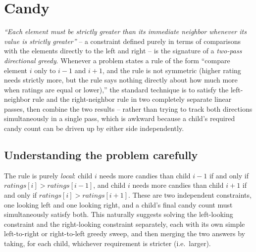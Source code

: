 \section{Candy}
\label{sec:candy}


\begin{patternbox}
\emph{``Each element must be strictly greater than its immediate neighbor
whenever its value is strictly greater''} -- a constraint defined purely in
terms of comparisons with the elements directly to the left and right -- is
the signature of a \emph{two-pass directional greedy}. Whenever a problem
states a rule of the form ``compare element $i$ only to $i-1$ and $i+1$, and
the rule is not symmetric (higher rating needs strictly more, but the rule
says nothing directly about how much more when ratings are equal or lower),''
the standard technique is to satisfy the left-neighbor rule and the
right-neighbor rule in two completely separate linear passes, then combine
the two results -- rather than trying to track both directions
simultaneously in a single pass, which is awkward because a child's
required candy count can be driven up by either side independently.
\end{patternbox}

\subsection*{Understanding the problem carefully}

The rule is purely \emph{local}: child $i$ needs more candies than child
$i-1$ if and only if $\textit{ratings}[i] > \textit{ratings}[i-1]$, and
child $i$ needs more candies than child $i+1$ if and only if
$\textit{ratings}[i] > \textit{ratings}[i+1]$. These are two independent
constraints, one looking left and one looking right, and a child's final
candy count must simultaneously satisfy both. This naturally suggests
solving the left-looking constraint and the right-looking constraint
separately, each with its own simple left-to-right or right-to-left greedy
sweep, and then merging the two answers by taking, for each child, whichever
requirement is stricter (i.e.\ larger).

